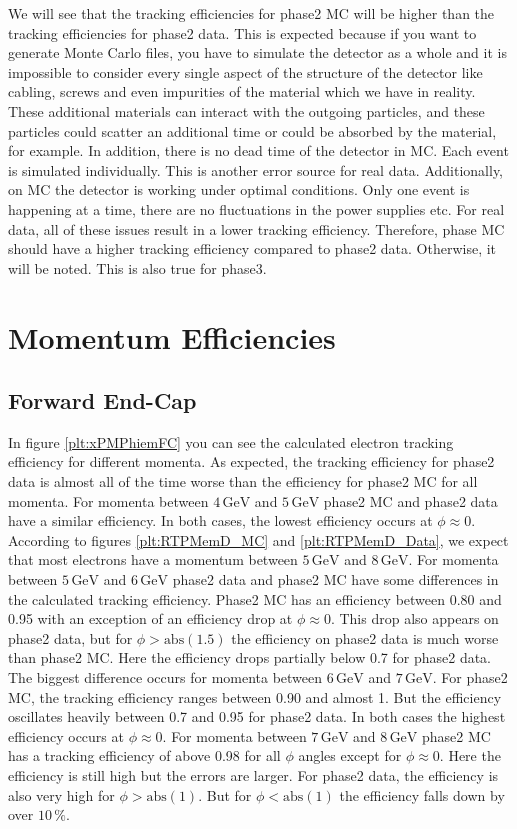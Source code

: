 \documentclass[a4paper,11pt,twosided,final,german,openbib,pdftex,listof=totoc,bibliography=totoc]{scrbook}
\begin{document}
We will see that the tracking efficiencies for phase2 MC will be higher than the tracking efficiencies for phase2 data. This is expected because if you want to generate Monte Carlo files, you have to simulate the detector as a whole and it is impossible to consider every single aspect of the structure of the detector like cabling, screws and even impurities of the material which we have in reality. These additional materials can interact with the outgoing particles, and these particles could scatter an additional time or could be absorbed by the material, for example. In addition, there is no dead time of the detector in MC. Each event is simulated individually. This is another error source for real data. Additionally, on MC the detector is working under optimal conditions. Only one event is happening at a time, there are no fluctuations in the power supplies etc.
For real data, all of these issues result in a lower tracking efficiency. Therefore, phase MC should have a higher tracking efficiency compared to phase2 data. Otherwise, it will be noted. This is also true for phase3.
 

\section{Momentum Efficiencies}


\subsection{Forward End-Cap}
\label{sec:MFC}

In figure \ref{plt:xPMPhiemFC} you can see the calculated electron tracking efficiency for different momenta. As expected, the tracking efficiency for phase2 data is almost all of the time worse than the efficiency for phase2 MC for all momenta. For momenta between $4\,\textrm{GeV}$ and $5\,\textrm{GeV}$ phase2 MC and phase2 data have a similar efficiency. In both cases, the lowest efficiency occurs at $\phi \approx 0$. According to figures \ref{plt:RTPMemD_MC} and \ref{plt:RTPMemD_Data}, we expect that most electrons have a momentum between $5\,\textrm{GeV}$ and $8\,\textrm{GeV}$. For momenta between $5\,\textrm{GeV}$ and $6\,\textrm{GeV}$ phase2 data and phase2 MC have some differences in the calculated tracking efficiency. Phase2 MC has an efficiency between 0.80 and 0.95 with an exception of an efficiency drop at $\phi \approx 0$. This drop also appears on phase2 data, but for $\phi > \textrm{abs}(1.5)$ the efficiency on phase2 data is much worse than phase2 MC. Here the efficiency drops partially below 0.7 for phase2 data.
The biggest difference occurs for momenta between $6\,\textrm{GeV}$ and $7\,\textrm{GeV}$. For phase2 MC, the tracking efficiency ranges between 0.90 and almost 1. But the efficiency oscillates heavily between 0.7 and 0.95 for phase2 data. In both cases the highest efficiency occurs at $\phi \approx 0$. 
For momenta between $7\,\textrm{GeV}$ and $8\,\textrm{GeV}$ phase2 MC has a tracking efficiency of above 0.98 for all $\phi$ angles except for $\phi \approx 0$. Here the efficiency is still high but the errors are larger. For phase2 data, the efficiency is also very high for $\phi >\textrm{abs}(1)$. But for $\phi < \textrm{abs}(1)$ the efficiency falls down by over $10\,\%$.
\end{document}

